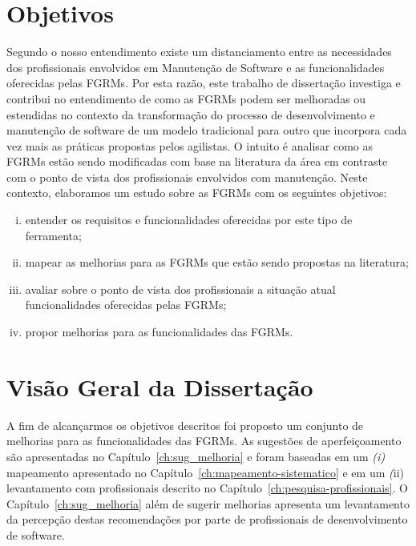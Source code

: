 \section{Objetivos}
\label{sec:intro-objetivos}

Segundo o nosso entendimento existe um distanciamento entre as necessidades dos
profissionais envolvidos em Manutenção de Software e as funcionalidades
oferecidas pelas FGRMs\@. Por esta razão, este trabalho de dissertação investiga
e contribui no entendimento de como as FGRMs podem ser melhoradas ou estendidas
no contexto da transformação do processo de desenvolvimento e manutenção de
software de um modelo tradicional para outro que incorpora cada vez mais as
práticas propostas pelos agilistas. O intuito é analisar como as FGRMs estão
sendo modificadas com base na literatura da área em contraste com o ponto de
vista dos profissionais envolvidos com manutenção. Neste contexto, elaboramos um
estudo sobre as FGRMs com os seguintes objetivos:

\begin{enumerate}[(i)]
	\item entender os requisitos e funcionalidades oferecidas por este tipo de
        ferramenta;
	\item mapear as melhorias para as FGRMs que estão sendo propostas na
		literatura;
	\item avaliar sobre o ponto de vista dos profissionais a
		situação atual funcionalidades oferecidas pelas FGRMs\@;
	\item propor melhorias para as funcionalidades das FGRMs\@.
\end{enumerate}


\section{Visão Geral da Dissertação}
\label{sec:intro-visao-geral}

A fim de alcançarmos os objetivos descritos foi proposto um conjunto de
melhorias para as funcionalidades das FGRMs. As sugestões de aperfeiçoamento são
apresentadas no Capítulo~\ref{ch:sug_melhoria} e foram baseadas em um
\textit{(i)} mapeamento apresentado no Capítulo~\ref{ch:mapeamento-sistematico}
e em um \textit(ii) levantamento com profissionais descrito no
Capítulo~\ref{ch:pesquisa-profissionais}. O Capítulo~\ref{ch:sug_melhoria} além
de sugerir melhorias apresenta um levantamento da percepção destas recomendações
por parte de profissionais de desenvolvimento de software.

